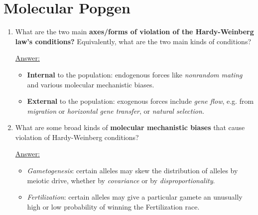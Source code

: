 \documentclass{article}
\newenvironment{QandA}{\begin{enumerate}[label=\bfseries Q\arabic*.]}
                       {\end{enumerate}}
\newenvironment{answered}{\par\normalfont\underline{Answer:}}{}
\begin{document}
\section{Molecular Popgen}
\begin{QandA}
  \item{What are the two main \textbf{axes/forms of violation of the Hardy-Weinberg law's conditions?} Equivalently, what are the two main kinds of conditions?}
    \begin{answered}
    \begin{itemize}
      \item{\textbf{Internal} to the population: endogenous forces like \textit{nonrandom mating} and various molecular mechanistic biases.}
      \item{\textbf{External} to the population: exogenous forces include \textit{gene flow}, e.g. from \textit{migration} or \textit{horizontal gene transfer}, or \textit{natural selection.}}
    \end{itemize}
    \end{answered}
  \item{What are some broad kinds of \textbf{molecular mechanistic biases} that cause violation of Hardy-Weinberg conditions?}
    \begin{answered}
    \begin{itemize}
      \item{\textit{Gametogenesis}: certain alleles may skew the distribution of alleles by meiotic drive, whether by \textit{covariance} or by \textit{disproportionality}.}
      \item{\textit{Fertilization}: certain alleles may give a particular gamete an unusually high or low probability of winning the Fertilization race.}
    \end{itemize}
    \end{answered}
\end{QandA}
\end{document}
